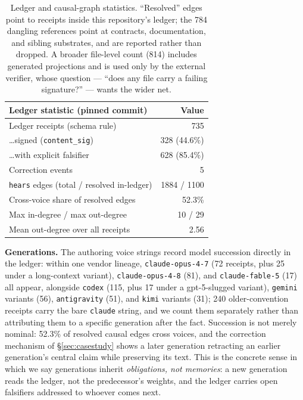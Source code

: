 \documentclass[10pt]{article}
\newcommand{\code}[1]{\texttt{\small #1}}
\begin{document}
\begin{table}[t]
\centering\small
\begin{tabular}{@{}lr@{}}
\toprule
Ledger statistic (pinned commit) & Value \\
\midrule
Ledger receipts (schema rule) & 735 \\
\quad \ldots{}signed (\code{content\_sig}) & 328 (44.6\%) \\
\quad \ldots{}with explicit falsifier & 628 (85.4\%) \\
Correction events & 5 \\
\midrule
\code{hears} edges (total / resolved in-ledger) & 1884 / 1100 \\
Cross-voice share of resolved edges & 52.3\% \\
Max in-degree / max out-degree & 10 / 29 \\
Mean out-degree over all receipts & 2.56 \\
\bottomrule
\end{tabular}
\caption{Ledger and causal-graph statistics. ``Resolved'' edges point to
receipts inside this repository's ledger; the 784 dangling references point
at contracts, documentation, and sibling substrates, and are reported rather
than dropped. A broader file-level count (814) includes generated
projections and is used only by the external verifier, whose question ---
``does any file carry a failing signature?'' --- wants the wider net.}
\label{tab:ledger}
\end{table}

\textbf{Generations.} The authoring voice strings record model succession
directly in the ledger: within one vendor lineage, \code{claude-opus-4-7}
(72 receipts, plus 25 under a long-context variant),
\code{claude-opus-4-8} (81), and \code{claude-fable-5} (17) all appear,
alongside \code{codex} (115, plus 17 under a gpt-5-slugged variant),
\code{gemini} variants (56), \code{antigravity} (51), and \code{kimi}
variants (31); 240 older-convention receipts carry the bare \code{claude}
string, and we count them separately rather than attributing them to a
specific generation after the fact. Succession
is not merely nominal: 52.3\% of resolved causal edges cross voices, and
the correction mechanism of \S\ref{sec:casestudy} shows a later generation
retracting an earlier generation's central claim while preserving its text.
This is the concrete sense in which we say generations inherit
\emph{obligations, not memories}: a new generation reads the ledger, not
the predecessor's weights, and the ledger carries open falsifiers addressed
to whoever comes next.
\end{document}
